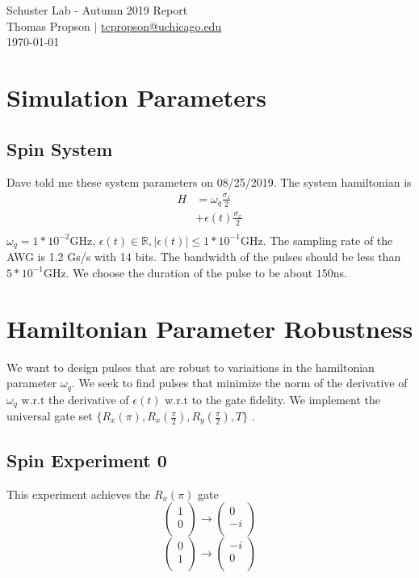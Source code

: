 \documentclass[letterpaper, 12pt]{article}
\begin{document}
\begin{center}
  {\huge Schuster Lab - Autumn 2019 Report} \\[0.5em]
  {\large Thomas Propson $\vert$ \href{mailto:tcpropson@uchicago.edu}
    {tcpropson@uchicago.edu} \\[0.5em] \today}
\end{center}

\section{Simulation Parameters}
\subsection{Spin System}
Dave told me these system parameters on 08/25/2019. The system hamiltonian is
\begin{align*}
  H &= \omega_{q}\frac{\sigma_{z}}{2}\\
    &+ \epsilon(t) \frac{\sigma_{x}}{2}\\
\end{align*}
$\omega_{q} = 1 * 10^{-2}$GHz, $\epsilon(t) \in \mathbb{R}, |\epsilon(t)| \le 1 * 10^{-1}$GHz.
The sampling rate of the AWG is 1.2 Gs/s with 14 bits. The bandwidth of the pulses should be
less than $5 * 10^{-1}$GHz. We choose the duration of the pulse to be about $150$ns. 

\section{Hamiltonian Parameter Robustness}
We want to design pulses that are robust to variaitions
in the hamiltonian parameter $\omega_{q}$. We seek to find pulses that minimize the
norm of the derivative of $\omega_{q}$ w.r.t the derivative of $\epsilon(t)$ w.r.t to the gate fidelity.
We implement the universal gate set $\{R_{x}(\pi), R_{x}(\frac{\pi}{2}), R_{y}(\frac{\pi}{2}), T\}$
\cite{heeres2017implementing}.

\subsection{Spin Experiment 0}
This experiment achieves the $R_{x}(\pi)$ gate
  \[
    \begin{pmatrix}
      1\\
      0\\
    \end{pmatrix}
    \rightarrow
    \begin{pmatrix}
      0\\
      -i\\
    \end{pmatrix}
   \]
   \[
    \begin{pmatrix}
      0\\
      1\\
    \end{pmatrix}
    \rightarrow
    \begin{pmatrix}
      -i\\
      0\\
    \end{pmatrix}
  \]
\end{document}
